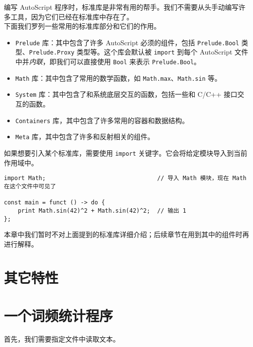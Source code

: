 编写 AutoScript 程序时，标准库是非常有用的帮手。我们不需要从头手动编写许多工具，因为它们已经在标准库中存在了。 \\

下面我们罗列一些常用的标准库部分和它们的作用。

\begin{itemize}
    \item \lstinline!Prelude! 库：其中包含了许多 AutoScript 必须的组件，包括 \lstinline!Prelude.Bool! 类型、\lstinline!Prelude.Proxy! 类型等。这个库会默认被 \lstinline!import! 到每个 AutoScript 文件中并\emph{内联}，即我们可以直接使用 \lstinline!Bool! 来表示 \lstinline!Prelude.Bool!。

    \item \lstinline!Math! 库：其中包含了常用的数学函数，如 \lstinline!Math.max!、\lstinline!Math.sin! 等。

    \item \lstinline!System! 库：其中包含了和系统底层交互的函数，包括一些和 C/C++ 接口交互的函数。

    \item \lstinline!Containers! 库，其中包含了许多常用的容器和数据结构。

    \item \lstinline!Meta! 库，其中包含了许多和反射相关的组件。
\end{itemize}

如果想要引入某个标准库，需要使用 \lstinline!import! 关键字。它会将给定模块导入到当前作用域中。

\begin{lstlisting}
import Math;								// 导入 Math 模块，现在 Math 在这个文件中可见了

const main = funct () -> do {
    print Math.sin(42)^2 + Math.sin(42)^2;  // 输出 1
};
\end{lstlisting}

本章中我们暂时不对上面提到的标准库详细介绍；后续章节在用到其中的组件时再进行解释。

\section{其它特性}



\section{一个词频统计程序}

首先，我们需要指定文件中读取文本。


